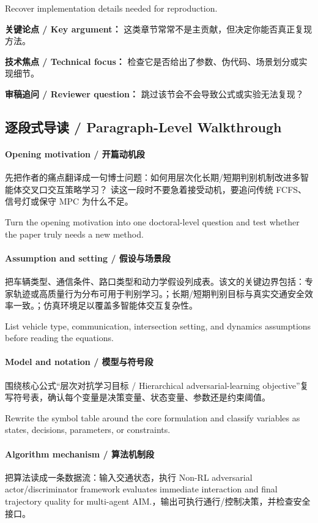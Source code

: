 \documentclass[UTF8,a4paper,11pt,fontset=fandol]{ctexart}
\begin{document}
Recover implementation details needed for reproduction.

\textbf{关键论点 / Key argument：} 这类章节常常不是主贡献，但决定你能否真正复现方法。

\textbf{技术焦点 / Technical focus：} 检查它是否给出了参数、伪代码、场景划分或实现细节。

\textbf{审稿追问 / Reviewer question：} 跳过该节会不会导致公式或实验无法复现？


\subsection{逐段式导读 / Paragraph-Level Walkthrough}
\paragraph{Opening motivation / 开篇动机段}先把作者的痛点翻译成一句博士问题：如何用层次化长期/短期判别机制改进多智能体交叉口交互策略学习？ 读这一段时不要急着接受动机，要追问传统 FCFS、信号灯或保守 MPC 为什么不足。

Turn the opening motivation into one doctoral-level question and test whether the paper truly needs a new method.

\paragraph{Assumption and setting / 假设与场景段}把车辆类型、通信条件、路口类型和动力学假设列成表。该文的关键边界包括：专家轨迹或高质量行为分布可用于判别学习。；长期/短期判别目标与真实交通安全效率一致。；仿真环境足以覆盖多智能体交互复杂性。

List vehicle type, communication, intersection setting, and dynamics assumptions before reading the equations.

\paragraph{Model and notation / 模型与符号段}围绕核心公式“层次对抗学习目标 / Hierarchical adversarial-learning objective”复写符号表，确认每个变量是决策变量、状态变量、参数还是约束阈值。

Rewrite the symbol table around the core formulation and classify variables as states, decisions, parameters, or constraints.

\paragraph{Algorithm mechanism / 算法机制段}把算法读成一条数据流：输入交通状态，执行 Non-RL adversarial actor/discriminator framework evaluates immediate interaction and final trajectory quality for multi-agent AIM.，输出可执行通行/控制决策，并检查安全接口。
\end{document}
